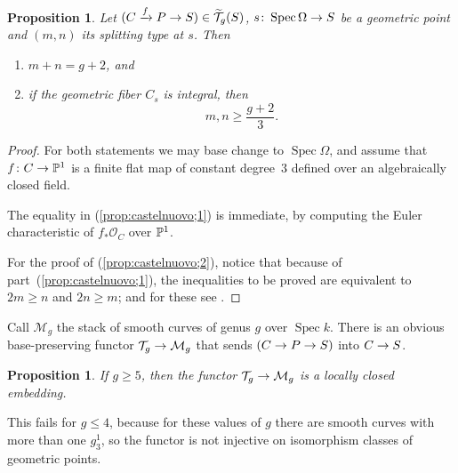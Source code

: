 \documentclass{amsart}
\numberwithin{equation}{section}
\numberwithin{subsection}{section}
\newenvironment{enumeratea}
{\begin{enumerate}[\upshape (a)]}
{\end{enumerate}}
\newtheorem{proposition}[theorem]{Proposition}
\theoremstyle{definition}
\theoremstyle{remark}
\newcommand\nome{testing}
\newcommand\call[1]{\label{#1}\renewcommand\nome{#1}}
\newcommand\itemref[1]{\item\label{\nome;#1}}
\newcommand\refpart[2]{(\ref{#1;#2})}
\newcommand\cM{\mathcal{M}} \newcommand\cN{\mathcal{N}}
\newcommand\cO{\mathcal{O}} \newcommand\cP{\mathcal{P}}
\newcommand\arr{\ifinner\to\else\longrightarrow\fi}
\newcommand{\xarr}{\xrightarrow}
\newcommand\spec{\operatorname{Spec}}
\newcommand{\T}[1][g]{\cT_{#1}}
\newcommand{\Tbig}[1][g]{\widetilde{\cT}_{#1}}
\begin{document}
\begin{proposition}\call{prop:castelnuovo}
Let $(C \xarr{f} P \to S) \in \Tbig(S)$, $s\colon \spec \Omega \arr S$ be a geometric point and $(m,n)$ its splitting type at $s$. Then

\begin{enumeratea}

\itemref{1} $m + n = g + 2$, and

\itemref{2} if the geometric fiber $C_{s}$ is integral, then
   \[
   m, n \geq \frac{g+2}{3}.
   \]

\end{enumeratea}
\end{proposition}


\begin{proof}
For both statements we may base change to $\spec\Omega$, and assume that $f\colon C \arr \PP^{1}$ is a finite flat map of constant degree~$3$ defined over an algebraically closed field.

The equality in \refpart{prop:castelnuovo}{1} is immediate, by computing the Euler characteristic of $f_{*}{\cO}_{C}$ over $\mathbb{P}^{1}$.

For the proof of \refpart{prop:castelnuovo}{2}, notice that because of part~\refpart{prop:castelnuovo}{1}, the inequalities to be proved are equivalent to $2m \geq n$ and $2n \geq m$; and for these see \cite[p.~1126]{mir3}.
\end{proof}

Call $\cM_{g}$ the stack of smooth curves of genus $g$ over $\spec k$. There is an obvious base-preserving functor $\T \arr \cM_{g}$ that sends $(C \arr P \to S)$ into $C \arr S$.

\begin{proposition}\label{embed}
If $g \geq 5$, then the functor $\T \arr \cM_{g}$ is a locally closed embedding.
\end{proposition}

This fails for $g \leq 4$, because for these values of $g$ there are smooth curves with more than one $g^{1}_{3}$, so the functor is not injective on isomorphism classes of geometric points.
\end{document}
